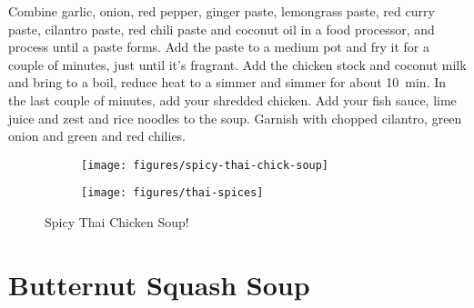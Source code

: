 Combine garlic, onion, red pepper, ginger paste, lemongrass paste, red curry
paste, cilantro paste, red chili paste and coconut oil in a food processor, and
process until a paste forms. Add the paste to a medium pot and fry it for a
couple of minutes, just until it's fragrant. Add the chicken stock and coconut
milk and bring to a boil, reduce heat to a simmer and simmer for about
\SI{10}{\minute}. In the last couple of minutes, add your shredded chicken. Add
your fish sauce, lime juice and zest and rice noodles to the soup. Garnish with
chopped cilantro, green onion and green and red chilies.
\begin{figure}
    \centering
    \begin{subfigure}{0.5\textwidth}
        \centering
        \texttt{[image: figures/spicy-thai-chick-soup]}
    \end{subfigure}
    \begin{subfigure}{0.37\textwidth}
        \centering
        \texttt{[image: figures/thai-spices]}
    \end{subfigure}
    \caption*{Spicy Thai Chicken Soup!}
\end{figure}

\section{Butternut Squash Soup}

